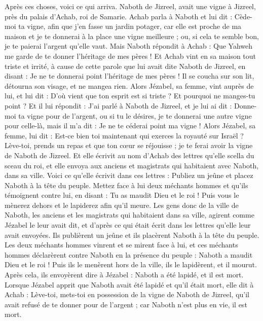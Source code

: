 \begin{multicols}{2}
\VerseOne{}Après ces choses, voici ce qui arriva. Naboth de Jizreel, avait une vigne à Jizreel, près du palais d'Achab, roi de Samarie.
Achab parla à Naboth et lui dit : Cède-moi ta vigne, afin que j'en fasse un jardin potager, car elle est proche de ma maison et je te donnerai à la place une vigne meilleure ; ou, si cela te semble bon, je te paierai l'argent qu'elle vaut.
Mais Naboth répondit à Achab : Que Yahweh me garde de te donner l'héritage de mes pères !
Et Achab vint en sa maison tout triste et irrité, à cause de cette parole que lui avait dite Naboth de Jizreel, en disant : Je ne te donnerai point l'héritage de mes pères ! Il se coucha sur son lit, détourna son visage, et ne mangea rien.
Alors Jézabel, sa femme, vint auprès de lui, et lui dit : D'où vient que ton esprit est si triste ? Et pourquoi ne manges-tu point ?
Et il lui répondit : J’ai parlé à Naboth de Jizreel, et je lui ai dit : Donne-moi ta vigne pour de l'argent, ou si tu le désires, je te donnerai une autre vigne pour celle-là, mais il m'a dit : Je ne te céderai point ma vigne !
Alors Jézabel, sa femme, lui dit : Est-ce bien toi maintenant qui exerces la royauté sur Israël ? Lève-toi, prends un repas et que ton cœur se réjouisse ; je te ferai avoir la vigne de Naboth de Jizreel.
Et elle écrivit au nom d'Achab des lettres qu’elle scella du sceau du roi, et elle envoya aux anciens et magistrats qui habitaient avec Naboth, dans sa ville.
Voici ce qu’elle écrivit dans ces lettres : Publiez un jeûne et placez Naboth à la tête du peuple.
Mettez face à lui deux méchants hommes et qu'ils témoignent contre lui, en disant : Tu as maudit Dieu et le roi ! Puis vous le mènerez dehors et le lapiderez afin qu'il meure.
Les gens donc de la ville de Naboth, les anciens et les magistrats qui habitaient dans sa ville, agirent comme Jézabel le leur avait dit, et d’après ce qui était écrit dans les lettres qu'elle leur avait envoyées.
Ils publièrent un jeûne et ils placèrent Naboth à la tête du peuple.
Les deux méchants hommes vinrent et se mirent face à lui, et ces méchants hommes déclarèrent contre Naboth en la présence du peuple : Naboth a maudit Dieu et le roi ! Puis ils le menèrent hors de la ville, ils le lapidèrent, et il mourut.
Après cela, ils envoyèrent dire à Jézabel : Naboth a été lapidé, et il est mort.
Lorsque Jézabel apprit que Naboth avait été lapidé et qu'il était mort, elle dit à Achab : Lève-toi, mets-toi en possession de la vigne de Naboth de Jizreel, qu’il avait refusé de te donner pour de l'argent ; car Naboth n'est plus en vie, il est mort.

\end{multicols}
